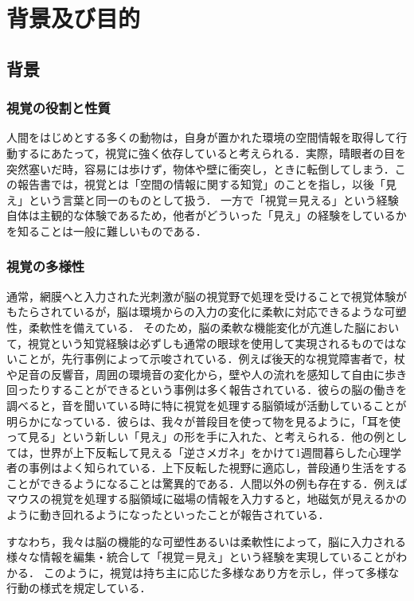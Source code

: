 \section{背景及び目的}
\subsection{背景}
\subsubsection{視覚の役割と性質}
人間をはじめとする多くの動物は，自身が置かれた環境の空間情報を取得して行動するにあたって，視覚に強く依存していると考えられる．実際，晴眼者の目を突然塞いだ時，容易には歩けず，物体や壁に衝突し，ときに転倒してしまう．この報告書では，視覚とは「空間の情報に関する知覚」のことを指し，以後「見え」という言葉と同一のものとして扱う．
一方で「視覚＝見える」という経験自体は主観的な体験であるため，他者がどういった「見え」の経験をしているかを知ることは一般に難しいものである．

\subsubsection{視覚の多様性}
通常，網膜へと入力された光刺激が脳の視覚野で処理を受けることで視覚体験がもたらされているが，脳は環境からの入力の変化に柔軟に対応できるような可塑性，柔軟性を備えている．
そのため，脳の柔軟な機能変化が亢進した脳において，視覚という知覚経験は必ずしも通常の眼球を使用して実現されるものではないことが，先行事例によって示唆されている．例えば後天的な視覚障害者で，杖や足音の反響音，周囲の環境音の変化から，壁や人の流れを感知して自由に歩き回ったりすることができるという事例は多く報告されている．彼らの脳の働きを調べると，音を聞いている時に特に視覚を処理する脳領域が活動していることが明らかになっている．彼らは、我々が普段目を使って物を見るように，「耳を使って見る」という新しい「見え」の形を手に入れた、と考えられる．他の例としては，世界が上下反転して見える「逆さメガネ」をかけて1週間暮らした心理学者の事例はよく知られている．上下反転した視野に適応し，普段通り生活をすることができるようになることは驚異的である．人間以外の例も存在する．例えばマウスの視覚を処理する脳領域に磁場の情報を入力すると，地磁気が見えるかのように動き回れるようになったといったことが報告されている．

すなわち，我々は脳の機能的な可塑性あるいは柔軟性によって，脳に入力される様々な情報を編集・統合して「視覚＝見え」という経験を実現していることがわかる．
このように，視覚は持ち主に応じた多様なあり方を示し，伴って多様な行動の様式を規定している．

